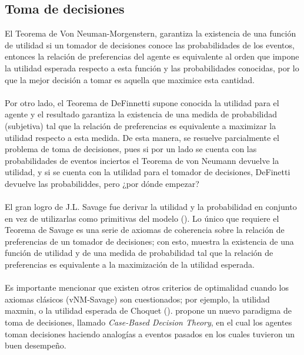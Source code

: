 \documentclass[11pt]{article}
\theoremstyle{plain}
\begin{document}
\subsection{Toma de decisiones}
El Teorema de Von Neuman-Morgenstern, garantiza la existencia de una función de utilidad si un tomador de decisiones conoce las probabilidades de los eventos, entonces  la relación de preferencias del agente es equivalente al orden que impone la utilidad esperada respecto a esta función y las probabilidades conocidas, por lo que la mejor decisión a tomar es aquella que maximice esta cantidad.\\
\\
\indent Por otro lado, el Teorema de DeFinnetti supone conocida la utilidad para el agente y el resultado garantiza la existencia de una medida de probabilidad (subjetiva) tal que la relación de preferencias es equivalente a maximizar la utilidad respecto a esta medida. De esta manera, se resuelve parcialmente el problema de toma de decisiones, pues si por un lado se cuenta con las probabilidades de eventos inciertos el Teorema de von Neumann devuelve la utilidad, y si se cuenta con la utilidad para el tomador de decisiones, DeFinetti devuelve las probabiliddes, pero ¿por dónde empezar? \\
\\
\indent El gran logro de J.L. Savage fue derivar  la utilidad y la probabilidad en conjunto en vez de utilizarlas como primitivas del modelo (\cite{gilboa2009decision}). Lo único que requiere el Teorema de Savage es una serie de axiomas de coherencia sobre la relación de preferencias de un tomador de decisiones; con esto, muestra la existencia de una función de utilidad y de una medida de probabilidad tal que la relación de preferencias es equivalente a la maximización de la utilidad esperada.\\
\\
 \indent Es importante mencionar que existen otros criterios de optimalidad cuando los axiomas clásicos (vNM-Savage) son cuestionados; por ejemplo, la utilidad maxmin, o la utilidad esperada de Choquet (\cite{gilboa2009decision}). \cite{gilboa2001theory} propone un nuevo paradigma de toma de decisiones, llamado \textit{Case-Based Decision Theory}, en el cual los agentes toman decisiones haciendo analogías a eventos pasados en los cuales tuvieron un buen desempeño.
\end{document}
